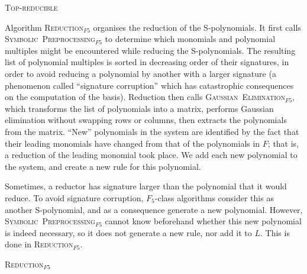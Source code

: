 \begin{algorithm}
\caption{\textsc{Top-reducible}}
\label{alg:topreducible} 
\end{algorithm}

Algorithm \textsc{Reduction}$_{F5}$ organises the reduction of the S-polynomials. It first calls \textsc{Symbolic\ Preprocessing}$_{F5}$ to determine which monomials and polynomial multiples might be encountered while reducing the S-polynomials. The resulting list of polynomial multiples is sorted in decreasing order of their signatures, in order to avoid reducing a polynomial by another with a larger signature (a phenomenon called ``signature corruption'' which has catastrophic consequences on the computation of the basis). Reduction then calls \textsc{Gaussian\ Elimination}$_{F5}$, which transforms the list of polynomials into a matrix, performs Gaussian elimination without swapping rows or columns, then extracts the polynomials from the matrix.
``New'' polynomials in the system are identified by the fact that their leading monomials have changed from that of the polynomials in $F$; that is, a reduction of the leading monomial took place.
We add each new polynomial to the system, and create a new rule for this polynomial.

Sometimes, a reductor has signature larger than the polynomial that it would reduce. To avoid signature corruption, $F_5$-class algorithms consider this as another S-polynomial, and as a consequence generate a new polynomial. However, \textsc{Symbolic\ Preprocessing}$_{F5}$ cannot know beforehand whether this new polynomial is indeed necessary, so it does not generate a new rule, nor add it to $L$. This is done in \textsc{Reduction}$_{F5}$.

\begin{algorithm}
\caption{\textsc{Reduction}$_{F5}$}
\label{alg:reduction5} 
\end{algorithm}

